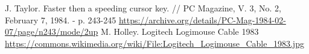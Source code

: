 \documentclass[11pt, a4paper]{article}
\begin{document}
\begin{thebibliography}{9}
 J. Taylor. Faster then a speeding cursor key. // PC Magazine, V. 3, No. 2, February 7, 1984. - p. 243-245 \url{https://archive.org/details/PC-Mag-1984-02-07/page/n243/mode/2up}
 M. Holley. Logitech Logimouse Cable 1983 \url{https://commons.wikimedia.org/wiki/File:Logitech_Logimouse_Cable_1983.jpg}
\end{thebibliography}
\end{document}
